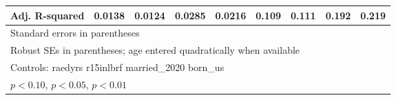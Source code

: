 \begin{table}[htbp]
\begin{tabular}{l*{8}{c}}
Adj. R-squared  &   0.0138         &   0.0124         &   0.0285         &   0.0216         &    0.109         &    0.111         &    0.192         &    0.219         \\
\bottomrule
\multicolumn{9}{l}{\footnotesize Standard errors in parentheses}\\
\multicolumn{9}{l}{\footnotesize Robust SEs in parentheses; age entered quadratically when available}\\
\multicolumn{9}{l}{\footnotesize Controls:  raedyrs r15inlbrf married\_2020 born\_us}\\
\multicolumn{9}{l}{\footnotesize \sym{*} \(p<0.10\), \sym{**} \(p<0.05\), \sym{***} \(p<0.01\)}\\
\end{tabular}
\end{table}
